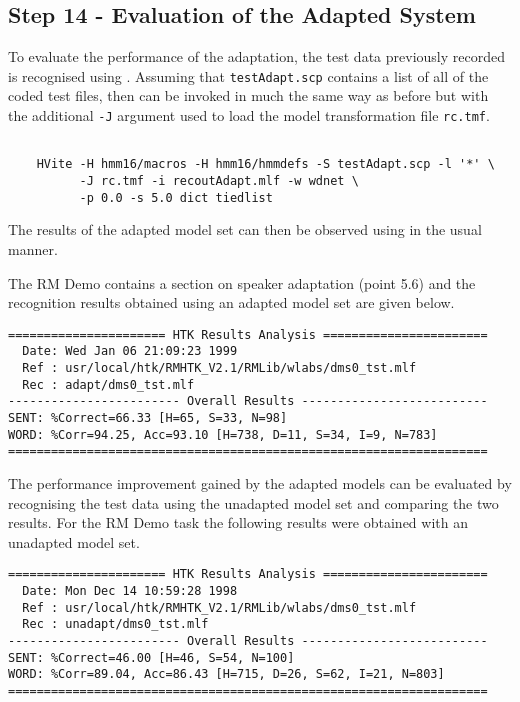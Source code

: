\subsection{Step 14 - Evaluation of the Adapted System}

To evaluate the performance of the adaptation, the test data previously recorded 
is recognised using . Assuming that \texttt{testAdapt.scp} contains a list 
of all of the coded test files, then  can be invoked in much the same way 
as before but with the additional \texttt{-J} argument used to load the model 
transformation file \texttt{rc.tmf}.

\begin{verbatim}

    HVite -H hmm16/macros -H hmm16/hmmdefs -S testAdapt.scp -l '*' \ 
          -J rc.tmf -i recoutAdapt.mlf -w wdnet \ 
          -p 0.0 -s 5.0 dict tiedlist

\end{verbatim}

\noindent
The results of the adapted model set can then be observed using  
in the usual manner.
 
The RM Demo contains a section on speaker adaptation (point 5.6) and the
recognition results obtained using an adapted model set are 
given below.

\begin{verbatim}
====================== HTK Results Analysis =======================
  Date: Wed Jan 06 21:09:23 1999
  Ref : usr/local/htk/RMHTK_V2.1/RMLib/wlabs/dms0_tst.mlf
  Rec : adapt/dms0_tst.mlf
------------------------ Overall Results --------------------------
SENT: %Correct=66.33 [H=65, S=33, N=98]
WORD: %Corr=94.25, Acc=93.10 [H=738, D=11, S=34, I=9, N=783]
===================================================================
\end{verbatim}

\noindent     
The performance improvement gained by the adapted models can
be evaluated by recognising the test data using the unadapted model
set and comparing the two results. For the RM Demo task the following
results were obtained with an unadapted model set.

\begin{verbatim}
====================== HTK Results Analysis =======================
  Date: Mon Dec 14 10:59:28 1998
  Ref : usr/local/htk/RMHTK_V2.1/RMLib/wlabs/dms0_tst.mlf
  Rec : unadapt/dms0_tst.mlf
------------------------ Overall Results --------------------------
SENT: %Correct=46.00 [H=46, S=54, N=100]
WORD: %Corr=89.04, Acc=86.43 [H=715, D=26, S=62, I=21, N=803]
===================================================================
\end{verbatim}

